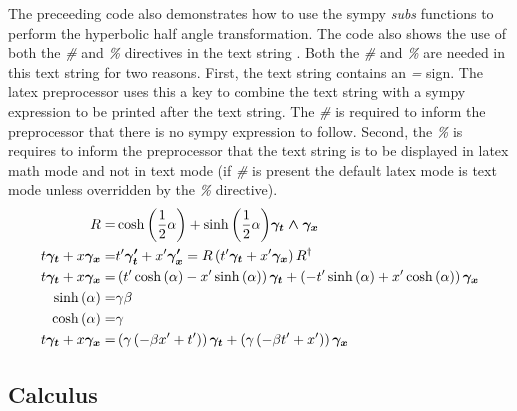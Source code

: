 \documentclass[letterpaper,10pt,english]{sphinxmanual}
\begin{document}
The preceeding code also demonstrates how to use the sympy \emph{subs} functions
to perform the hyperbolic half angle transformation.  The code also shows
the use of both the \emph{\#} and \emph{\%} directives in the text string
.
Both the \emph{\#} and \emph{\%} are needed in this text string for two reasons.  First, the text string contains an \emph{=} sign.  The latex preprocessor
uses this a key to combine the text string with a sympy expression to be printed after the text string.  The \emph{\#} is required to inform
the preprocessor that there is no sympy expression to follow.  Second, the \emph{\%} is requires to inform the preprocessor that the text
string is to be displayed in latex math mode and not in text mode (if \emph{\#} is present the default latex mode is text mode unless
overridden by the \emph{\%} directive).
  \begin{align*} R =& \cosh{\left (\frac{1}{2} \alpha \right )}+\sinh{\left (\frac{1}{2} \alpha \right )}\boldsymbol{\gamma_{t}\wedge \gamma_{x}} \\
  t\boldsymbol{\gamma_{t}}+x\boldsymbol{\gamma_{x}} =& t'\boldsymbol{\gamma'_{t}}+x'\boldsymbol{\gamma'_{x}} = R\left ( t'\boldsymbol{\gamma_{t}}+x'\boldsymbol{\gamma_{x}}\right ) R^{\dagger} \\
  t\boldsymbol{\gamma_{t}}+x\boldsymbol{\gamma_{x}} =& \left ( t' \cosh{\left (\alpha \right )} - x' \sinh{\left (\alpha \right )}\right ) \boldsymbol{\gamma_{t}}+\left ( - t' \sinh{\left (\alpha \right )} + x' \cosh{\left (\alpha \right )}\right ) \boldsymbol{\gamma_{x}} \\
  {\sinh}\left ( {\alpha} \right ) =& \gamma\beta \\
  {\cosh}\left ( {\alpha} \right ) =& \gamma \\
  t\boldsymbol{\gamma_{t}}+x\boldsymbol{\gamma_{x}} =& \left ( \gamma \left(- \beta x' + t'\right)\right ) \boldsymbol{\gamma_{t}}+\left ( \gamma \left(- \beta t' + x'\right)\right ) \boldsymbol{\gamma_{x}}
  \end{align*}

\subsection{Calculus}
\label{GA:calculus}
\end{document}
